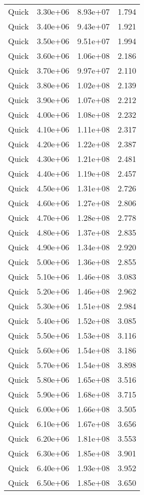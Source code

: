 \begin{table}
\begin{tabular}{llll}
Quick & 3.30e+06 & 8.93e+07 & 1.794 \\
Quick & 3.40e+06 & 9.43e+07 & 1.921 \\
Quick & 3.50e+06 & 9.51e+07 & 1.994 \\
Quick & 3.60e+06 & 1.06e+08 & 2.186 \\
Quick & 3.70e+06 & 9.97e+07 & 2.110 \\
Quick & 3.80e+06 & 1.02e+08 & 2.139 \\
Quick & 3.90e+06 & 1.07e+08 & 2.212 \\
Quick & 4.00e+06 & 1.08e+08 & 2.232 \\
Quick & 4.10e+06 & 1.11e+08 & 2.317 \\
Quick & 4.20e+06 & 1.22e+08 & 2.387 \\
Quick & 4.30e+06 & 1.21e+08 & 2.481 \\
Quick & 4.40e+06 & 1.19e+08 & 2.457 \\
Quick & 4.50e+06 & 1.31e+08 & 2.726 \\
Quick & 4.60e+06 & 1.27e+08 & 2.806 \\
Quick & 4.70e+06 & 1.28e+08 & 2.778 \\
Quick & 4.80e+06 & 1.37e+08 & 2.835 \\
Quick & 4.90e+06 & 1.34e+08 & 2.920 \\
Quick & 5.00e+06 & 1.36e+08 & 2.855 \\
Quick & 5.10e+06 & 1.46e+08 & 3.083 \\
Quick & 5.20e+06 & 1.46e+08 & 2.962 \\
Quick & 5.30e+06 & 1.51e+08 & 2.984 \\
Quick & 5.40e+06 & 1.52e+08 & 3.085 \\
Quick & 5.50e+06 & 1.53e+08 & 3.116 \\
Quick & 5.60e+06 & 1.54e+08 & 3.186 \\
Quick & 5.70e+06 & 1.54e+08 & 3.898 \\
Quick & 5.80e+06 & 1.65e+08 & 3.516 \\
Quick & 5.90e+06 & 1.68e+08 & 3.715 \\
Quick & 6.00e+06 & 1.66e+08 & 3.505 \\
Quick & 6.10e+06 & 1.67e+08 & 3.656 \\
Quick & 6.20e+06 & 1.81e+08 & 3.553 \\
Quick & 6.30e+06 & 1.85e+08 & 3.901 \\
Quick & 6.40e+06 & 1.93e+08 & 3.952 \\
Quick & 6.50e+06 & 1.85e+08 & 3.650 \\

\end{tabular}
\end{table}
